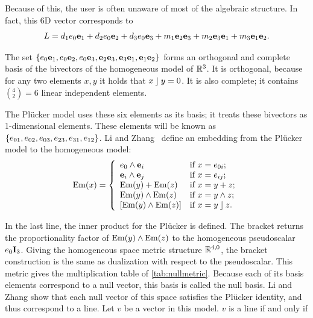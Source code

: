 Because of this, the user is often unaware of most of the algebraic structure.  In fact, this 6D vector corresponds to
\begin{equation*}
  L = d_1 e_0\mathbf{e}_1 + d_2 e_0\mathbf{e}_2 + d_3 e_0\mathbf{e}_3 + m_1 \mathbf{e}_2\mathbf{e}_3 + m_2 \mathbf{e}_3\mathbf{e}_1 + m_3 \mathbf{e}_1\mathbf{e}_2 .
\end{equation*}

The set $\{e_0\mathbf{e}_1, e_0\mathbf{e}_2, e_0\mathbf{e}_3, \mathbf{e}_2\mathbf{e}_3, \mathbf{e}_3\mathbf{e}_1, \mathbf{e}_1\mathbf{e}_2\}$ forms an orthogonal and complete basis of the bivectors of the homogeneous model of $\mathbb{R}^3$.  It is orthogonal, because for any two elements $x, y$ it holds that $x \mathbin{\rfloor} y = 0$. It is also complete; it contains $(^4_2) = 6$ linear independent elements.

The Pl\"ucker model uses these six elements as its basis; it treats these bivectors as 1-dimensional elements.  These elements will be known as $\{e_{01}, e_{02}, e_{03}, e_{23}, e_{31}, e_{12}\}$.  Li and Zhang~\cite{Hongbo} define an embedding from the Pl\"ucker model to the homogeneous model:
\begin{equation} \label{eq:Em}
  \operatorname{Em}(x) = \left\{ 
    \begin{array}{ll}
      e_0 \wedge \mathbf{e}_i &\mbox{if $x = e_{0i}$}; \\
      \mathbf{e}_i \wedge \mathbf{e}_j &\mbox{if $x = e_{ij}$}; \\
      \operatorname{Em}(y) + \operatorname{Em}(z) &\mbox{if $x = y + z$}; \\
      \operatorname{Em}(y) \wedge \operatorname{Em}(z) &\mbox{if $x = y \wedge z$}; \\
      \left[\operatorname{Em}(y) \wedge \operatorname{Em}(z)\right] &\mbox{if $x = y \mathbin{\rfloor} z$}. \\
    \end{array}
    \right.
\end{equation}

In the last line, the inner product for the Pl\"ucker is defined.  The bracket returns the proportionality factor of $\operatorname{Em}(y) \wedge \operatorname{Em}(z)$ to the homogeneous pseudoscalar $e_0\mathbf{I}_3$.  Giving the homogeneous space metric structure $\mathbb{R}^{4,0}$, the bracket construction is the same as dualization with respect to the pseudoscalar.  This metric gives the multiplication table of \autoref{tab:nullmetric}.  Because each of its basis elements correspond to a null vector, this basis is called the null basis.  Li and Zhang show that each null vector of this space satisfies the Pl\"ucker identity, and thus correspond to a line.  Let $v$ be a vector in this model.  $v$ is a line if and only if

